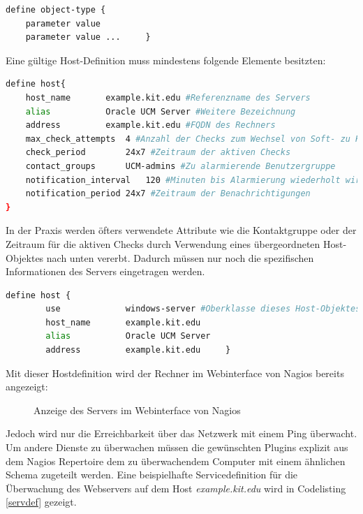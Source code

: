 \begin{lstlisting}[captionpos=b, caption=Nagiosschema für Objektdefinitionen, label=schmeaobj, breaklines = false]
define object-type {
	parameter value
	parameter value ...		}
\end{lstlisting}


Eine gültige Host-Definition muss mindestens folgende Elemente besitzten:

\begin{lstlisting}[captionpos=b, caption=Definition eines Hostobjektes, label=hostobj, breaklines = true, language=sh]
define host{
	host_name		example.kit.edu #Referenzname des Servers
	alias			Oracle UCM Server #Weitere Bezeichnung
	address			example.kit.edu #FQDN des Rechners
	max_check_attempts	4 #Anzahl der Checks zum Wechsel von Soft- zu Hard-State
	check_period		24x7 #Zeitraum der aktiven Checks
	contact_groups		UCM-admins #Zu alarmierende Benutzergruppe
	notification_interval	120 #Minuten bis Alarmierung wiederholt wird
	notification_period	24x7 #Zeitraum der Benachrichtigungen
}
\end{lstlisting}

In der Praxis werden öfters verwendete Attribute wie die Kontaktgruppe oder der Zeitraum für die aktiven Checks durch Verwendung eines übergeordneten Host-Objektes nach unten vererbt.
Dadurch müssen nur noch die spezifischen Informationen des Servers eingetragen werden.
\begin{lstlisting}[captionpos=b, caption=Verkürzte Definition eines Hostobjektes, label=vhostobj, breaklines = true, language=sh]
define host {
        use             windows-server #Oberklasse dieses Host-Objektes
        host_name       example.kit.edu
        alias           Oracle UCM Server
        address         example.kit.edu		}
\end{lstlisting}

Mit dieser Hostdefinition wird der Rechner im Webinterface von Nagios bereits angezeigt:

\begin{figure}[ht]
	\centering
		\caption{Anzeige des Servers im Webinterface von Nagios}
		\label{check-swap}
\end{figure}

Jedoch wird nur die Erreichbarkeit über das Netzwerk mit einem Ping überwacht.
Um andere Dienste zu überwachen müssen die gewünschten Plugins explizit aus dem Nagios Repertoire dem zu überwachendem Computer mit einem ähnlichen Schema zugeteilt werden.
Eine beispielhafte Servicedefinition für die Überwachung des Webservers auf dem Host \textit{example.kit.edu} wird in Codelisting \ref{servdef} gezeigt.


